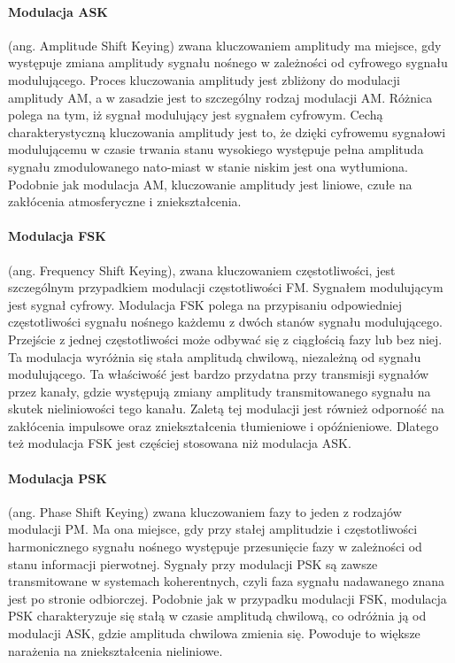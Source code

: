 \documentclass[]{report}
\begin{document}
\paragraph{Modulacja ASK} (ang. Amplitude Shift Keying) zwana kluczowaniem amplitudy ma miejsce, gdy występuje zmiana amplitudy sygnału nośnego w zależności od cyfrowego sygnału modulującego. Proces kluczowania amplitudy jest zbliżony do modulacji amplitudy AM, a w zasadzie jest to szczególny rodzaj modulacji AM. Różnica polega na tym, iż sygnał modulujący jest sygnałem cyfrowym. Cechą charakterystyczną kluczowania amplitudy jest to, że dzięki cyfrowemu sygnałowi modulującemu w czasie trwania stanu wysokiego występuje pełna amplituda sygnału zmodulowanego nato-miast w stanie niskim jest ona wytłumiona. Podobnie jak modulacja AM, kluczowanie amplitudy jest liniowe, czułe na zakłócenia atmosferyczne i zniekształcenia. 

\paragraph{Modulacja FSK}  (ang. Frequency Shift Keying), zwana kluczowaniem częstotliwości, jest szczególnym przypadkiem modulacji częstotliwości FM. Sygnałem modulującym jest sygnał cyfrowy. Modulacja FSK polega na przypisaniu odpowiedniej częstotliwości sygnału nośnego każdemu z dwóch stanów sygnału modulującego. Przejście z jednej częstotliwości może odbywać się z ciągłością fazy lub bez niej. Ta modulacja wyróżnia się stała amplitudą chwilową, niezależną od sygnału modulującego. Ta właściwość jest bardzo przydatna przy transmisji sygnałów przez kanały, gdzie występują zmiany amplitudy transmitowanego sygnału na skutek nieliniowości tego kanału. Zaletą tej modulacji jest również odporność na zakłócenia impulsowe oraz zniekształcenia tłumieniowe i opóźnieniowe. Dlatego też modulacja FSK jest częściej stosowana niż modulacja ASK. 


\paragraph{Modulacja PSK} (ang. Phase Shift Keying) zwana kluczowaniem fazy to jeden z rodzajów modulacji PM. Ma ona miejsce, gdy przy stałej amplitudzie i częstotliwości harmonicznego sygnału nośnego występuje przesunięcie fazy w zależności od stanu informacji pierwotnej. Sygnały przy modulacji PSK są zawsze transmitowane w systemach koherentnych, czyli faza sygnału nadawanego znana jest po stronie odbiorczej. Podobnie jak w przypadku modulacji FSK, modulacja PSK charakteryzuje się stałą w czasie amplitudą chwilową, co odróżnia ją od modulacji ASK, gdzie amplituda chwilowa zmienia się. Powoduje to większe narażenia na zniekształcenia nieliniowe. 
\end{document}
